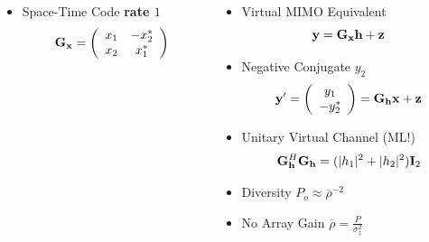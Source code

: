 \documentclass[xcolor=dvipsnames,aspectratio=169]{beamer}
\begin{document}
{\begin{columns}
\begin{column}{6cm}
\begin{figure}
\end{figure}
  \begin{itemize}
   \item Space-Time Code \textbf{rate $1$}
   $$\mathbf{G}_{\mathbf{x}}=\left(\begin{array}{cc}
            x_1&-x_2^*\\
            x_2&x_1^*\\
\end{array}\right)$$
  \end{itemize}
 \end{column}
 \begin{column}{6cm}
  \begin{itemize}
   \item Virtual MIMO Equivalent
   $$\mathbf{y}=\mathbf{G}_{\mathbf{x}}\mathbf{h}+\mathbf{z}$$
   \item Negative Conjugate $y_2$
   $$\mathbf{y}'=\left(\begin{array}{cc}y_1\\-y_2^*\end{array}\right)=\mathbf{G}_{\mathbf{h}}\mathbf{x}+\mathbf{z}$$
   \item Unitary Virtual Channel (\textcolor{ARust}{ML!})
   $$\mathbf{G}_{\mathbf{h}}^H\mathbf{G}_{\mathbf{h}}=(|h_1|^2+|h_2|^2)\mathbf{I}_2$$
   \item Diversity $P_o\approx \overline{\rho}^{-2}$
   \item No Array Gain $\overline{\rho}=\frac{P}{\sigma_z^2}$
  \end{itemize}
 \end{column}
\end{columns}
}
\end{document}
